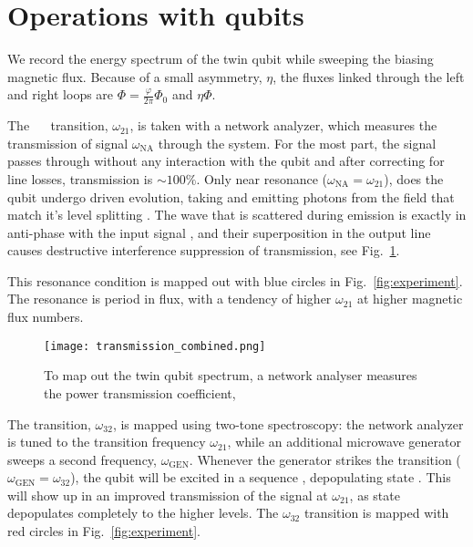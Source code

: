 \section{Operations with qubits}
\label{sec:characterisation}



\noindent We  record the  energy spectrum  of the twin  qubit while  sweeping the
biasing magnetic  flux.  Because  of a  small asymmetry,  $\eta$, the  fluxes linked
through the left and right loops are $ \Phi = \frac{\varphi}{2\pi}\Phi_0$ and $ \eta\Phi $.

The  ~\ilra~  transition,  $\omega_{21}$,  is  taken  with  a  network
analyzer, which measures  the transmission of signal  $\omega_{\text{NA}}$ through the
system.  For  the most part,  the signal  passes through without  any interaction
with  the   qubit  and  after   correcting  for  line  losses,   transmission  is
$  \sim 100\%  $.   Only  near resonance  ($\omega_{\text{NA}}=\omega_{21}$),  does the  qubit
undergo driven evolution,  taking and emitting photons from the  field that match
it's level splitting  \cite{rabi}. The wave that is scattered  during emission is
exactly in  anti-phase with  the input  signal \cite{abdumalikov2010},  and their
superposition in the  output line causes destructive  interference suppression of
transmission, see Fig.~\ref{fig:transmission}.

This   resonance    condition   is    mapped   out    with   blue    circles   in
Fig.~\ref{fig:experiment}.  The resonance  is period in flux, with  a tendency of
higher $\omega_{21}$ at higher magnetic flux numbers.  

\begin{figure}[h]
  \centering \texttt{[image: transmission\_combined.png]}
  \caption{To map  out the twin qubit  spectrum, a network analyser  measures the
    power transmission coefficient,  }
  \label{fig:transmission}
\end{figure}

The  \ilra{}   transition,  $\omega_{32}$,  is  mapped   using  two-tone
spectroscopy:  the  network  analyzer  is   tuned  to  the  transition  frequency
$ \omega_{21}  $, while an additional  microwave generator sweeps a  second frequency,
$  \omega_{\text{GEN}} $.   Whenever  the generator  strikes the  \ira{}
transition ($\omega_{\text{GEN}} = \omega_{32} $), the  qubit will be excited in a sequence
      ,  depopulating
state .  This will  show up in an improved transmission  of the signal at
$\omega_{21}$, as  state   depopulates completely to  the higher  levels.  The
$\omega_{32}$      transition     is      mapped     with      red     circles      in
Fig.~\ref{fig:experiment}. 

